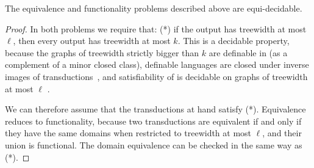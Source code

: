 \begin{fact}\label{fact:equi-decidable}
    The equivalence and functionality problems described above are equi-decidable.
\end{fact}
\begin{proof}
In both problems we require that: (*) if the output has treewidth at most $\ell$, then every output has treewidth at most $k$. This is a decidable property, because the graphs of treewidth strictly bigger than  $k$ are definable in \mso (as a complement of  a minor closed class),  \mso definable languages are closed under inverse images of \mso transductions~\cite[Backwards Translation Theorem]{courcelleGraphStructureMonadic2012}, and satisfiability of \mso is decidable on graphs of treewidth at most $\ell$ \cite[Theorem 5.80]{courcelleGraphStructureMonadic2012}. 

We can therefore assume that the transductions at hand satisfy (*). 
    Equivalence reduces to functionality, because two transductions are  equivalent if and only if they have the same domains when restricted to treewidth at most $\ell$, and their union is  functional. The domain equivalence can be checked in the same way as (*).


\end{proof}
